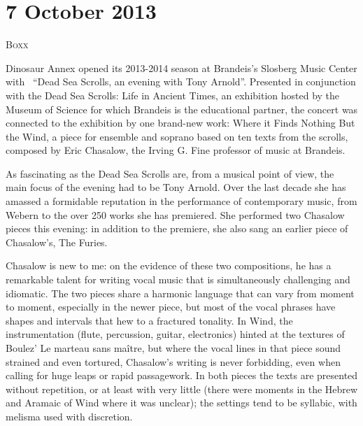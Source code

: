\chapter{7 October 2013}

\textsc{Boxx}

Dinosaur Annex opened its 2013-2014 season at Brandeis’s Slosberg Music Center with  “Dead Sea Scrolls, an evening with Tony Arnold”. Presented in conjunction with the Dead Sea Scrolls: Life in Ancient Times, an exhibition hosted by the Museum of Science for which Brandeis is the educational partner, the concert was connected to the exhibition by one brand-new work: Where it Finds Nothing But the Wind, a piece for ensemble and soprano based on ten texts from the scrolls, composed by Eric Chasalow, the Irving G. Fine professor of music at Brandeis.

As fascinating as the Dead Sea Scrolls are, from a musical point of view, the main focus of the evening had to be Tony Arnold. Over the last decade she has amassed a formidable reputation in the performance of contemporary music, from Webern to the over 250 works she has premiered. She performed two Chasalow pieces this evening: in addition to the premiere, she also sang an earlier piece of Chasalow’s, The Furies.

Chasalow is new to me: on the evidence of these two compositions, he has a remarkable talent for writing vocal music that is simultaneously challenging and idiomatic. The two pieces share a harmonic language that can vary from moment to moment, especially in the newer piece, but most of the vocal phrases have shapes and intervals that hew to a fractured tonality. In Wind, the instrumentation (flute, percussion, guitar, electronics) hinted at the textures of Boulez’ Le marteau sans maître, but where the vocal lines in that piece sound strained and even tortured, Chasalow’s writing is never forbidding, even when calling for huge leaps or rapid passagework. In both pieces the texts are presented without repetition, or at least with very little (there were moments in the Hebrew and Aramaic of Wind where it was unclear); the settings tend to be syllabic, with melisma used with discretion.

